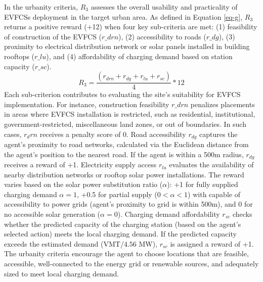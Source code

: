 \documentclass[preprint,12pt]{elsarticle}
\begin{document}
In the urbanity criteria, $R_3$ assesses the overall usability and practicality of EVFCSs deployment in the target urban area. As defined in Equation \eqref{eq-g}, $R_3$ returns a positive reward (+12) when four key sub-criteria are met: (1) feasibility of construction of the EVFCS ($r\_drn$), (2) accessibility to roads ($r\_dg$), (3) proximity to electrical distribution network or solar panels installed in building rooftops ($r\_lu$), and (4) affordability of charging demand based on station capacity ($r\_sc$). 
\begin{equation} \label{eq-g}
    R_3 = \frac{(r_{drn}+r_{dg} + r_{lu} + r_{sc})}{4}*12
\end{equation}
Each sub-criterion contributes to evaluating the site's suitability for EVFCS implementation. For instance, construction feasibility $r\_drn$ penalizes placements in areas where EVFCS installation is restricted, such as residential, institutional, government-restricted, miscellaneous land zones, or out of boundaries. In such cases, $r_drn$ receives a penalty score of 0. Road accessibility $r_{dg}$ captures the agent's proximity to road networks, calculated via the Euclidean distance from the agent's position to the nearest road. If the agent is within a 500m radius, $r_{dg}$ receives a reward of +1. Electricity supply access $r_{lu}$ evaluates the availability of nearby distribution networks or rooftop solar power installations. The reward varies based on the solar power substitution ratio ($\alpha$): +1 for fully supplied charging demand $\alpha = 1$, +0.5 for partial supply ($0 < \alpha <1$) with capable of accessibility to power grids (agent's proximity to grid is within 500m), and 0 for no accessible solar generation ($\alpha=0$). Charging demand affordability $r_{sc}$ checks whether the predicted capacity of the charging station (based on the agent's selected action) meets the local charging demand. If the predicted capacity exceeds the estimated demand ($\mathrm{VMT}/4.56$ MW), $r_{sc}$ is assigned a reward of +1. The urbanity criteria encourage the agent to choose locations that are feasible, accessible, well-connected to the energy grid or renewable sources, and adequately sized to meet local charging demand. 
\end{document}
